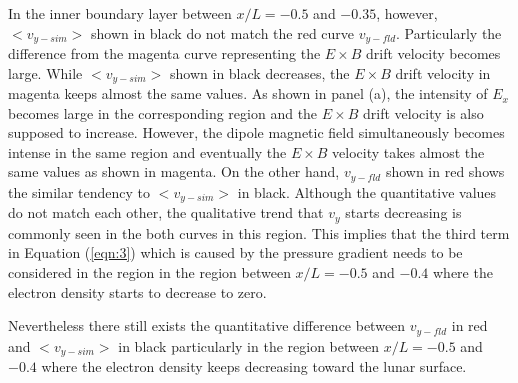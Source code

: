 \documentclass[draft,jgrga]{agutex2015}
\begin{document}
\begin{article}
In the inner boundary layer between $x/L=-0.5$ and $-0.35$, 
however, 
$<v_{y-sim}>$ shown in black do not match the red curve
$v_{y-fld}$.
%
%
Particularly the difference from the magenta curve representing 
the $E \times B$ drift velocity becomes large.
While $<v_{y-sim}>$ shown in black decreases,
the $E \times B$ drift velocity in magenta keeps almost the same values. 
As shown in panel (a), the intensity of $E_x$ becomes large 
in the corresponding region and the $E \times B$ drift velocity 
is also supposed to increase. 
However, the dipole magnetic field simultaneously becomes intense 
in the same region and eventually the $E \times B$ velocity 
takes almost the same values as shown in magenta.
On the other hand, 
$v_{y-fld}$ shown in red shows the similar tendency to 
$<v_{y-sim}>$ in black.
Although the quantitative values do not match each other,
the qualitative trend that $v_y$ starts decreasing 
is commonly seen in the both curves in this region.
This implies that the third term in Equation (\ref{eqn:3})
which is caused by the
pressure gradient needs to be considered in the region 
in the region between $x/L =-0.5$ and $-0.4$ 
where the electron density starts to decrease to zero. 

Nevertheless there still exists the quantitative difference between 
$v_{y-fld}$ in red and $<v_{y-sim}>$ in black
particularly in the region between $x/L =-0.5$ and $-0.4$ 
where the electron density keeps decreasing toward the lunar surface.


\end{article}
\end{document}
